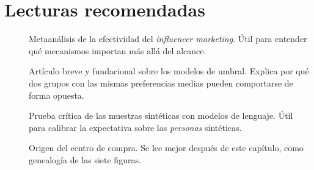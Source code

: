 \section{Lecturas recomendadas}

\begin{description}
  \item[\textcite{leung2022influencer}] Metaanálisis de la efectividad del \textit{influencer marketing}. Útil para entender qué mecanismos importan más allá del alcance.
  \item[\textcite{granovetter1978}] Artículo breve y fundacional sobre los modelos de umbral. Explica por qué dos grupos con las mismas preferencias medias pueden comportarse de forma opuesta.
  \item[\textcite{bisbee2024}] Prueba crítica de las muestras sintéticas con modelos de lenguaje. Útil para calibrar la expectativa sobre las \textit{personas} sintéticas.
  \item[\textcite{webster1972}] Origen del centro de compra. Se lee mejor después de este capítulo, como genealogía de las siete figuras.
\end{description}
